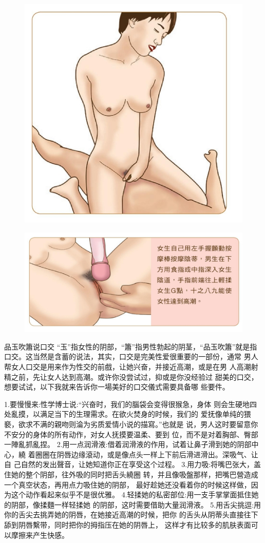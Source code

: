 \documentclass[12pt,UTF8]{ctexbook}
\begin{document}
\begin{figure}[htbp]
	\centering
	\includegraphics[width=0.7\linewidth]{17}
	\caption{}
	\label{fig:1}
\end{figure}

\begin{figure}[htbp]
	\centering
	\includegraphics[width=0.7\linewidth]{18}
	\caption{}
	\label{fig:1}
\end{figure}

品玉吹簫说口交
“玉”指女性的阴部，“簫”指男性勃起的阴茎，“品玉吹簫”就是指
口交。这当然是含蓄的说法，其实，口交是完美性爱很重要的一部份，通常
男人帮女人口交是用来作为性交的前戲，让她兴奋，并接近高潮，或是在男
人高潮射精之前，先让女人达到高潮。或许你没尝试过，抑或是你没经验过
甜美的口交，想要试试，以下我就来告诉你一場美好的口交儀式需要具备哪
些要件。

1.要慢慢来:性学博士说:“兴奋时，我们的腦袋会变得很猴急，身体
则会生硬地四处亂摸，以满足当下的生理需求。在欲火焚身的时候，我们的
爱抚像单纯的猥褻，欲求不满的親吻则淪为劣质爱情小说的描寫。”也就是
说，男人这时要留意你不安分的身体的所有动作，对女人抚摸要温柔、要到
位，而不是对着胸部、臀部一陣亂抓亂捏。
2.用一点润滑液:借着润滑液的作用，试着让鼻子滑到她的阴部中心，繞
着圈圈在阴唇边缘滾动，或是像点头一样上下前后滑进滑出。深吸气、让自
己自然的发出聲音，让她知道你正在享受这个过程。
3.用力吸:将嘴巴张大，盖住她的整个阴部，往外吸的同时把舌头繞圈
转，并且像吸盤那样，把嘴巴營造成一个真空状态，再用点力吸住她的阴部，
最好趁她还没看着你的时候这样做，因为这个动作看起来似乎不是很优雅。
4.轻揉她的私密部位:用一支手掌掌面抵住她的阴部，像揉麵一样轻揉她
的阴部，这时需要借助大量润滑液。
5.用舌尖挑逗:用你的舌尖去挑弄她的阴唇，在她接近高潮的时候，把你
的舌头从阴蒂头直接往下舔到阴唇繫带，同时把你的拇指压在她的阴唇上，
这样才有比较多的肌肤表面可以摩擦来产生快感。
\end{document}
